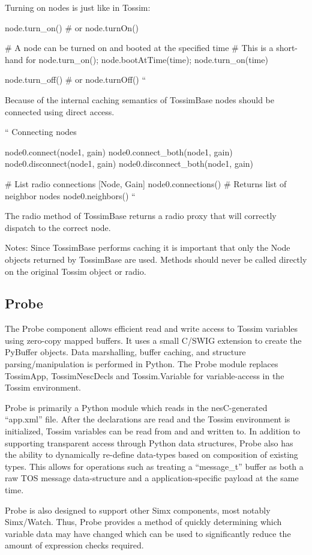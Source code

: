 Turning on nodes is just like in Tossim:

node.turn_on() # or node.turnOn()

# A node can be turned on and booted at the specified time
# This is a short-hand for node.turn_on(); node.bootAtTime(time);
node.turn_on(time)

node.turn_off() # or node.turnOff()
``

Because of the internal caching semantics of TossimBase nodes should
be connected using direct access.

``
Connecting nodes

node0.connect(node1, gain)
node0.connect_both(node1, gain)
node0.disconnect(node1, gain)
node0.disconnect_both(node1, gain)

# List radio connections [Node, Gain]
node0.connections()
# Returns list of neighbor nodes
node0.neighbors()
``

The radio method of TossimBase returns a radio proxy that will
correctly dispatch to the correct node.

Notes: Since TossimBase performs caching it is important that only the
Node objects returned by TossimBase are used. Methods should never be
called directly on the original Tossim object or radio.


\subsection{Probe}

The Probe component allows efficient read and write access to Tossim
variables using zero-copy mapped buffers. It uses a small C/SWIG
extension to create the PyBuffer objects. Data marshalling, buffer
caching, and structure parsing/manipulation is performed in
Python. The Probe module replaces TossimApp, TossimNescDecls and
Tossim.Variable for variable-access in the Tossim environment.

Probe is primarily a Python module which reads in the nesC-generated
``app.xml'' file. After the declarations are read and the Tossim
environment is initialized, Tossim variables can be read from and and
written to. In addition to supporting transparent access through
Python data structures, Probe also has the ability to dynamically
re-define data-types based on composition of existing types. This
allows for operations such as treating a ``message\_t'' buffer as both
a raw TOS message data-structure and a application-specific payload at
the same time.

Probe is also designed to support other Simx components, most notably
Simx/Watch. Thus, Probe provides a method of quickly determining which
variable data may have changed which can be used to significantly
reduce the amount of expression checks required.

